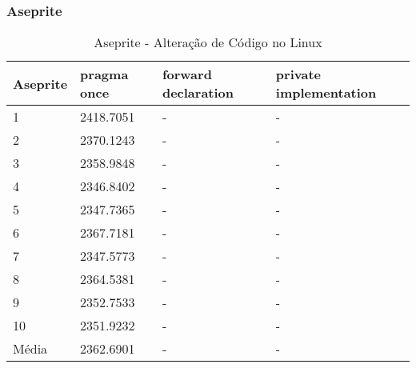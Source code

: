 \subsubsection*{Aseprite}
\begin{table}[!h]
\centering
\caption{Aseprite - Alteração de Código no Linux }
\label{tab:alteracao_de_codigo:linux:aseprite}
\begin{tabular}{llll}
\textbf{Aseprite} & \textbf{pragma once} & \textbf{forward declaration} & \textbf{private implementation}   \\ \toprule
1                                    &  2418.7051   &  -   &  -   \\ 
2                                    &  2370.1243   &  -   &  -   \\ 
3                                    &  2358.9848   &  -   &  -   \\ 
4                                    &  2346.8402   &  -   &  -   \\ 
5                                    &  2347.7365   &  -   &  -   \\ 
6                                    &  2367.7181   &  -   &  -   \\ 
7                                    &  2347.5773   &  -   &  -   \\ 
8                                    &  2364.5381   &  -   &  -   \\ 
9                                    &  2352.7533   &  -   &  -   \\ 
10                                   &  2351.9232   &  -   &  -   \\ \bottomrule
Média                                &  2362.6901   &  -   &  -   \\ 
\end{tabular}
\end{table}

